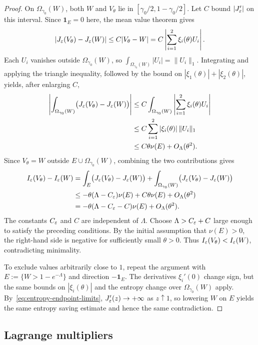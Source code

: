 \begin{proof}
On $\Omega_{\gamma_0}(W)$, both $W$ and $V_\theta$ lie in
$[\gamma_0/2,1-\gamma_0/2]$.  Let $C$ bound $|J_\varepsilon'|$ on this interval.
Since $\mathbf1_E=0$ here, the mean value theorem gives
\[
  |J_\varepsilon(V_\theta)-J_\varepsilon(W)|
  \le C|V_\theta-W|
  =C\left|\sum_{i=1}^2\xi_i(\theta)U_i\right|.
\]
Each $U_i$ vanishes outside $\Omega_{\gamma_0}(W)$, so
$\int_{\Omega_{\gamma_0}(W)}|U_i|=\|U_i\|_1$.
Integrating and applying the triangle inequality, followed by the bound
on $|\xi_1(\theta)|+|\xi_2(\theta)|$, yields, after enlarging $C$,
\begin{align*}
  \left|\int_{\Omega_{\gamma_0}(W)}\bigl(J_\varepsilon(V_\theta)-J_\varepsilon(W)\bigr)\right|
  &\le C\int_{\Omega_{\gamma_0}(W)}\left|\sum_{i=1}^2\xi_i(\theta)U_i\right|\\
  &\le C\sum_{i=1}^2|\xi_i(\theta)|\,\|U_i\|_1\\
  &\le C\theta\nu(E)+O_\Lambda(\theta^2).
\end{align*}
Since $V_\theta=W$ outside $E\cup\Omega_{\gamma_0}(W)$, combining the
two contributions gives
\begin{align*}
  I_\varepsilon(V_\theta)-I_\varepsilon(W)
  &=\int_E\bigl(J_\varepsilon(V_\theta)-J_\varepsilon(W)\bigr)
    +\int_{\Omega_{\gamma_0}(W)}\bigl(J_\varepsilon(V_\theta)-J_\varepsilon(W)\bigr)\\
  &\le-\theta(\Lambda-C_\varepsilon)\nu(E)
    +C\theta\nu(E)+O_\Lambda(\theta^2)\\
  &=-\theta(\Lambda-C_\varepsilon-C)\nu(E)+O_\Lambda(\theta^2).
\end{align*}
The constants $C_\varepsilon$ and $C$ are independent of $\Lambda$.
Choose $\Lambda>C_\varepsilon+C$ large enough to satisfy the preceding conditions.
By the initial assumption that $\nu(E)>0$, the right-hand side is negative for sufficiently small $\theta>0$.
Thus $I_\varepsilon(V_\theta)<I_\varepsilon(W)$, contradicting minimality.

To exclude values arbitrarily close to $1$, repeat the argument with
$E:=\{W>1-e^{-\Lambda}\}$ and direction $-\mathbf1_E$.
The derivatives $\xi_i'(0)$ change sign, but the same bounds on
$|\xi_i(\theta)|$ and the entropy change over $\Omega_{\gamma_0}(W)$ apply.
By~\eqref{eq:entropy-endpoint-limits},
$J_\varepsilon'(z)\to+\infty$ as $z\uparrow1$, so lowering $W$ on $E$ yields the same entropy saving
estimate and hence the same contradiction.
\end{proof}
 
\subsection{Lagrange multipliers}\label{sec:fixed-multipliers}

